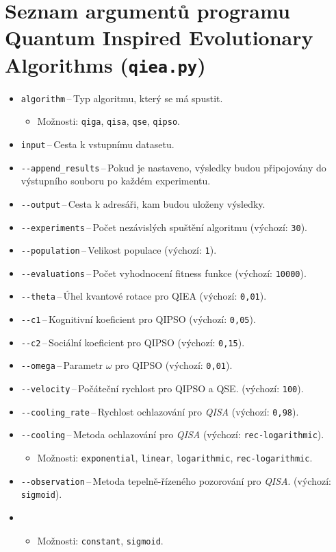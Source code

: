 \section*{Seznam argumentů programu Quantum Inspired Evolutionary Algorithms (\texttt{qiea.py})}
\begin{itemize}
    \item \texttt{algorithm}\,--\,Typ algoritmu, který se má spustit. 
    \begin{itemize}
        \item Možnosti: \texttt{qiga}, \texttt{qisa}, \texttt{qse}, \texttt{qipso}.
    \end{itemize}
    \item \texttt{input}\,--\,Cesta k vstupnímu datasetu.
    \item \texttt{-{}-append\_results}\,--\,Pokud je nastaveno, výsledky budou připojovány do výstupního souboru po každém experimentu.
    \item \texttt{-{}-output}\,--\,Cesta k adresáři, kam budou uloženy výsledky.
    \item \texttt{-{}-experiments}\,--\,Počet nezávislých spuštění algoritmu (výchozí: \texttt{30}).
    \item \texttt{-{}-population}\,--\,Velikost populace (výchozí: \texttt{1}).
    \item \texttt{-{}-evaluations}\,--\,Počet vyhodnocení fitness funkce (výchozí: \texttt{10000}).
    \item \texttt{-{}-theta}\,--\,Úhel kvantové rotace pro QIEA (výchozí: \texttt{0,01}).
    \item \texttt{-{}-c1}\,--\,Kognitivní koeficient pro QIPSO (výchozí: \texttt{0,05}).
    \item \texttt{-{}-c2}\,--\,Sociální koeficient pro QIPSO (výchozí: \texttt{0,15}).
    \item \texttt{-{}-omega}\,--\,Parametr $\omega$ pro QIPSO (výchozí: \texttt{0,01}).
    \item \texttt{-{}-velocity}\,--\,Počáteční rychlost pro QIPSO a QSE. (výchozí: \texttt{100}).
    \item \texttt{-{}-cooling\_rate}\,--\,Rychlost ochlazování pro \emph{QISA} (výchozí: \texttt{0,98}).
    \item \texttt{-{}-cooling}\,--\,Metoda ochlazování pro \emph{QISA} (výchozí: \texttt{rec-logarithmic}). 
    \begin{itemize}
        \item Možnosti: \texttt{exponential}, \texttt{linear}, \texttt{logarithmic}, \texttt{rec-logarithmic}.
    \end{itemize}
    \item \texttt{-{}-observation}\,--\,Metoda tepelně-řízeného pozorování pro \emph{QISA}. (výchozí: \texttt{sigmoid}).
    \item \begin{itemize}
        \item Možnosti: \texttt{constant}, \texttt{sigmoid}.
    \end{itemize}
\end{itemize}

